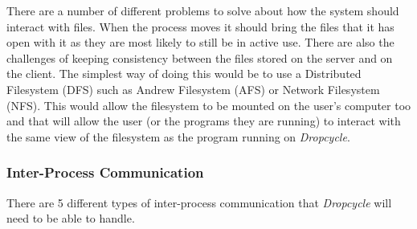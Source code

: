 \documentclass[12pt, a4paper]{article}
\begin{document}
There are a number of different problems to solve about how the system should
interact with files. When the process moves it should bring the files that it
has open with it as they are most likely to still be in active use. There are
also the challenges of keeping consistency between the files stored on the
server and on the client. The simplest way of doing this would be to use
a Distributed Filesystem (DFS) such as Andrew Filesystem (AFS) or Network
Filesystem (NFS). This would allow the filesystem to be mounted on the user's
computer too and that will allow the user (or the programs they are running) to
interact with the same view of the filesystem as the program running on
\emph{Dropcycle}.

\subsubsection{Inter-Process Communication}

There are 5 different types of inter-process communication that
\emph{Dropcycle} will need to be able to handle.
\end{document}
